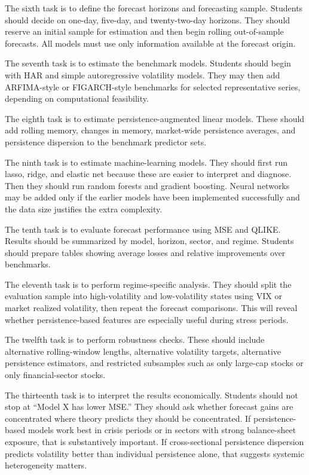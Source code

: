 \documentclass[12pt]{article}
\begin{document}
The sixth task is to define the forecast horizons and forecasting sample. Students should decide on one-day, five-day, and twenty-two-day horizons. They should reserve an initial sample for estimation and then begin rolling out-of-sample forecasts. All models must use only information available at the forecast origin.

The seventh task is to estimate the benchmark models. Students should begin with HAR and simple autoregressive volatility models. They may then add ARFIMA-style or FIGARCH-style benchmarks for selected representative series, depending on computational feasibility.

The eighth task is to estimate persistence-augmented linear models. These should add rolling memory, changes in memory, market-wide persistence averages, and persistence dispersion to the benchmark predictor sets.

The ninth task is to estimate machine-learning models. They should first run lasso, ridge, and elastic net because these are easier to interpret and diagnose. Then they should run random forests and gradient boosting. Neural networks may be added only if the earlier models have been implemented successfully and the data size justifies the extra complexity.

The tenth task is to evaluate forecast performance using MSE and QLIKE. Results should be summarized by model, horizon, sector, and regime. Students should prepare tables showing average losses and relative improvements over benchmarks.

The eleventh task is to perform regime-specific analysis. They should split the evaluation sample into high-volatility and low-volatility states using VIX or market realized volatility, then repeat the forecast comparisons. This will reveal whether persistence-based features are especially useful during stress periods.

The twelfth task is to perform robustness checks. These should include alternative rolling-window lengths, alternative volatility targets, alternative persistence estimators, and restricted subsamples such as only large-cap stocks or only financial-sector stocks.

The thirteenth task is to interpret the results economically. Students should not stop at ``Model X has lower MSE.'' They should ask whether forecast gains are concentrated where theory predicts they should be concentrated. If persistence-based models work best in crisis periods or in sectors with strong balance-sheet exposure, that is substantively important. If cross-sectional persistence dispersion predicts volatility better than individual persistence alone, that suggests systemic heterogeneity matters.
\end{document}
